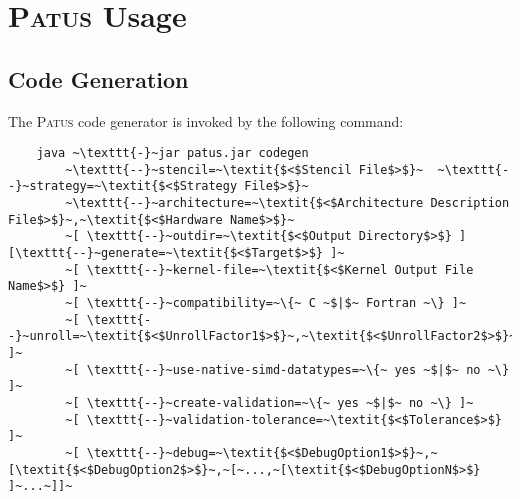 \chapter{\textsc{Patus} Usage}
\label{sec:cmdline}

\section{Code Generation}

The \textsc{Patus} code generator is invoked by the following command:
\vspace{4mm}
\begin{lstlisting}
	java ~\texttt{-}~jar patus.jar codegen
		~\texttt{--}~stencil=~\textit{$<$Stencil File$>$}~  ~\texttt{--}~strategy=~\textit{$<$Strategy File$>$}~
		~\texttt{--}~architecture=~\textit{$<$Architecture Description File$>$}~,~\textit{$<$Hardware Name$>$}~
		~[ \texttt{--}~outdir=~\textit{$<$Output Directory$>$} ] [\texttt{--}~generate=~\textit{$<$Target$>$} ]~
		~[ \texttt{--}~kernel-file=~\textit{$<$Kernel Output File Name$>$} ]~
		~[ \texttt{--}~compatibility=~\{~ C ~$|$~ Fortran ~\} ]~
		~[ \texttt{--}~unroll=~\textit{$<$UnrollFactor1$>$}~,~\textit{$<$UnrollFactor2$>$}~,...~ ]~
		~[ \texttt{--}~use-native-simd-datatypes=~\{~ yes ~$|$~ no ~\} ]~
		~[ \texttt{--}~create-validation=~\{~ yes ~$|$~ no ~\} ]~
		~[ \texttt{--}~validation-tolerance=~\textit{$<$Tolerance$>$} ]~
		~[ \texttt{--}~debug=~\textit{$<$DebugOption1$>$}~,~[\textit{$<$DebugOption2$>$}~,~[~...,~[\textit{$<$DebugOptionN$>$} ]~...~]]~
\end{lstlisting}
\vspace{4mm}

